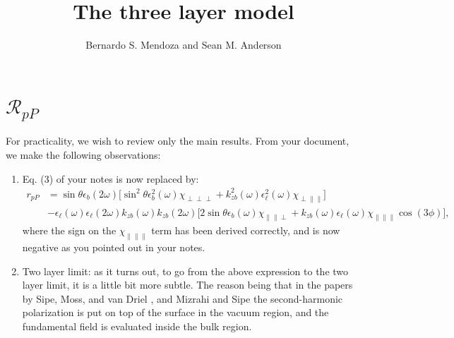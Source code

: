 \documentclass{article}
\title{The three layer model}
\author{Bernardo S. Mendoza and Sean M. Anderson}
\begin{document}
\maketitle

\section{\texorpdfstring{$\mathcal{R}_{pP}$}{Rpp}}

For practicality, we wish to review only the main results. From your document,
we make the following observations:

\begin{enumerate}
\item Eq. (3) of your notes is now replaced by:
\begin{equation}\label{m81}
\begin{split}
r_{pP} &=
\sin\theta\epsilon_{b}(2\omega)
\Big[
  \sin^2\theta\epsilon^2_{b}(\omega)\chi_{\perp\perp\perp}
+ k^2_{zb}(\omega)\epsilon^2_{\ell}(\omega)\chi_{\perp\parallel\parallel}
\Big]\\
&- \epsilon_{\ell}(\omega)\epsilon_{\ell}(2\omega)
   k_{zb}(\omega)k_{zb}(2\omega)
\Big[
  2\sin\theta\epsilon_{b}(\omega)\chi_{\parallel\parallel\perp}
+ k_{zb}(\omega)\epsilon_{\ell}(\omega)
\chi_{\parallel\parallel\parallel}\cos(3\phi) 
\Big],
\end{split}
\end{equation}
where the sign on the $\chi_{\parallel\parallel\parallel}$ term has been derived
correctly, and is now negative as you pointed out in your notes.

\item Two layer limit: as it turns out, to go from the above expression to the
two layer limit, it is a little bit more subtle. The reason being that in the
papers by Sipe, Moss, and van Driel \cite{sipePRB87}, and Mizrahi and Sipe
\cite{mizrahiJOSA88} the second-harmonic polarization is put on top of the
surface in the vacuum region, and the fundamental field is evaluated inside the
bulk region.


\end{enumerate}
\end{document}

